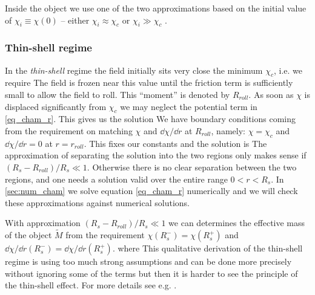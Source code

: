 Inside the object we use one of the two approximations based on the initial value of $\chi_i\equiv\chi(0)$ -- either $\chi_i\approx\chi_c$ or $\chi_i\gg\chi_c$ .
\subsubsection{Thin-shell regime}
In the \textit{thin-shell} regime the field initially sits very close the minimum $\chi_c$, i.e. we require
The field is frozen near this value until the friction term is sufficiently small to allow the field to roll. This ``moment'' is denoted by $R_{roll}$. As soon as $\chi$ is displaced significantly from $\chi_c$ we may neglect the potential term in \eqref{eq_cham_r}. This gives us the solution
We have boundary conditions coming from the requirement on matching $\chi$ and  $\dd\chi/\dd r$ at $R_{roll}$, namely: $\chi=\chi_c$ and $\dd\chi/\dd r=0$ at $r=r_{roll}$. This fixes our constants and the solution is
The approximation of separating the solution into the two regions only makes sense if $(R_s-R_{roll})/R_s\ll1$. Otherwise there is no clear separation between the two regions, and one needs a solution valid over the entire range $0<r<R_s$. In \autoref{sec:num_cham} we solve equation \eqref{eq_cham_r} numerically and we will check these approximations against numerical solutions.

With approximation $(R_s-R_{roll})/R_s\ll1$ we can determines the effective mass of the object $\tilde{M}$ from the requirement $\chi(R_s^-)=\chi(R_s^+)$ and $\dd\chi/\dd r(R_s^-)=\dd\chi/\dd r(R_s^+)$.
where
This qualitative derivation of the thin-shell regime is using too much strong assumptions and can be done more precisely without ignoring some of the terms but then it is harder to see the principle of the thin-shell effect. For more details see e.g. \textcite{Tamaki:2008mf,2007PhRvD..75f3501M,Waterhouse:2006wv}.
